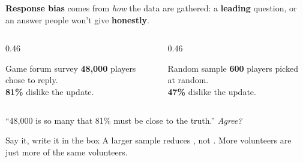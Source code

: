 \documentclass[aspectratio=169, 11pt]{beamer}
\begin{document}
\begin{frame}[t, plain]
  \vspace{2pt}
  \textbf{Response bias} comes from \emph{how} the data are gathered: a \textbf{leading} question,
  or an answer people won't give \textbf{honestly}.
  \vspace{6pt}
  \begin{columns}[t]
    \begin{column}{0.46\textwidth}
      \begin{block}{Game forum survey}
        \textbf{48{,}000} players chose to reply.\\
        \textbf{81\%} dislike the update.
      \end{block}
    \end{column}
    \begin{column}{0.46\textwidth}
      \begin{block}{Random sample}
        \textbf{600} players picked at random.\\
        \textbf{47\%} dislike the update.
      \end{block}
    \end{column}
  \end{columns}
  \vspace{6pt}
  ``48{,}000 is so many that 81\% must be close to the truth.'' \emph{Agree?}
  \vspace{6pt}
  \begin{block}{Say it, write it in the box}
    A larger sample reduces , not . More volunteers are just
    more of the same volunteers.
  \end{block}
\end{frame}
\end{document}
